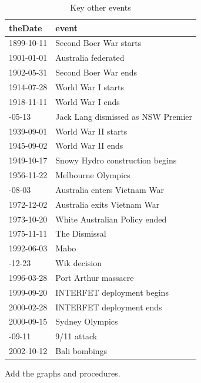 \documentclass[12pt,]{article}
\theoremstyle{definition}
\theoremstyle{definition}
\theoremstyle{definition}
\theoremstyle{remark}
\begin{document}
\begin{table}

\caption{\label{tab:others}Key other events}
\centering
\fontsize{8}{10}\selectfont
\begin{tabular}[t]{ll}
\toprule
theDate & event\\
\midrule
1899-10-11 & Second Boer War starts\\
1901-01-01 & Australia federated\\
1902-05-31 & Second Boer War ends\\
1914-07-28 & World War I starts\\
1918-11-11 & World War I ends\\
\addlinespace
1932-05-13 & Jack Lang dismissed as NSW Premier\\
1939-09-01 & World War II starts\\
1945-09-02 & World War II ends\\
1949-10-17 & Snowy Hydro construction begins\\
1956-11-22 & Melbourne Olympics\\
\addlinespace
1962-08-03 & Australia enters Vietnam War\\
1972-12-02 & Australia exits Vietnam War\\
1973-10-20 & White Australian Policy ended\\
1975-11-11 & The Dismissal\\
1992-06-03 & Mabo\\
\addlinespace
1996-12-23 & Wik decision\\
1996-03-28 & Port Arthur massacre\\
1999-09-20 & INTERFET deployment begins\\
2000-02-28 & INTERFET deployment ends\\
2000-09-15 & Sydney Olympics\\
\addlinespace
2001-09-11 & 9/11 attack\\
2002-10-12 & Bali bombings\\
\bottomrule
\end{tabular}
\end{table}

Add the graphs and procedures.

\newpage




\newpage
\singlespacing 
\renewcommand\refname{References}

\end{document}
